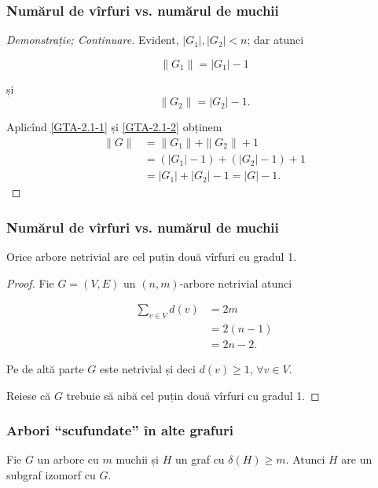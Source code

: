 \begin{frame}
  \frametitle{Numărul de vîrfuri vs. numărul de muchii}

\begin{proof}[Demonstrație; Continuare]
Evident, $|G_1|,|G_2|<n$; dar atunci

\begin{equation}
  \|G_1\|=|G_1|-1 \label{GTA-2.1-1}
\end{equation}

și
\begin{equation}
  \|G_2\|=|G_2|-1. \label{GTA-2.1-2}
\end{equation}\pause

Aplicînd \eqref{GTA-2.1-1} și \eqref{GTA-2.1-2} obținem
\[
\begin{array}{rl}
  \|G\| & =\|G_1\| + \|G_2\| + 1\\
        & =\left(|G_1| - 1\right) + \left(|G_2| - 1\right) + 1\\
        & =|G_1|+|G_2|-1=|G|-1.
  \end{array}
\]
 
\end{proof}

\end{frame}

\begin{frame}
  \frametitle{Numărul de vîrfuri vs. numărul de muchii}

 \begin{corollary}
Orice arbore netrivial are cel puțin două vîrfuri cu gradul 1.
\end{corollary}\pause

\begin{proof}
Fie $G=(V,E)$ un $(n, m)$-arbore netrivial atunci

\[
\begin{array}{rl}
  \sum_{v\in V}d(v) & = 2m\\
                    & = 2(n-1)\\
                    & = 2n-2.
\end{array}  
\]\pause

Pe de altă parte $G$ este netrivial și deci $d(v)\geq 1$, $\forall v\in V$.\pause

Reiese că $G$ trebuie să aibă cel puțin două vîrfuri cu gradul 1.
\end{proof}
\end{frame}

\begin{frame}
  \frametitle{Arbori ``scufundate'' în alte grafuri}

\begin{theorem}
Fie $G$ un arbore cu $m$ muchii și $H$ un graf cu $\delta(H)\geq m$. Atunci $H$ are un subgraf izomorf cu $G$.
\end{theorem}

\end{frame}

